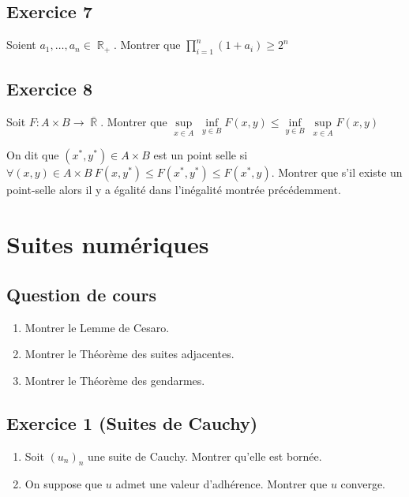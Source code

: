 \documentclass{article}
\DeclareMathOperator{\R}{\mathbb{R}}
\begin{document}
\subsection*{Exercice 7} 

Soient $a_1, \dots, a_n \in \R_+$. Montrer que $\displaystyle \prod_{i=1}^n{(1+ a_i)} \geqslant 2^n$ 

\subsection*{Exercice 8} 

Soit $F : A\times B \to \overline{\R}$. Montrer que $\underset{x\in A }{\sup} \ \underset{y \in B}{\inf} F(x, y) \leq \underset{y \in B}{\inf} \ \underset{x \in A}{\sup} F(x, y) $ 

On dit que $(x^*, y^*) \in A\times B$ est un point selle si $\forall (x, y) \in A\times B \ F(x,y^*) \leq F(x^*, y^*) \leq F(x^*, y)$. Montrer que s'il existe un point-selle alors il y a égalité dans l'inégalité montrée précédemment.  

\clearpage

\section{Suites numériques} 

\subsection*{Question de cours} 

\begin{enumerate}
    \item Montrer le Lemme de Cesaro. 
    \item Montrer le Théorème des suites adjacentes. 
    \item Montrer le Théorème des gendarmes. 
\end{enumerate}

\subsection*{Exercice 1 (Suites de Cauchy)} 

\begin{enumerate}
    \item Soit $(u_n)_{n}$ une suite de Cauchy. Montrer qu'elle est bornée. 
    \item On suppose que $u$ admet une valeur d'adhérence. Montrer que $u$ converge. 
\end{enumerate}    
\end{document}
